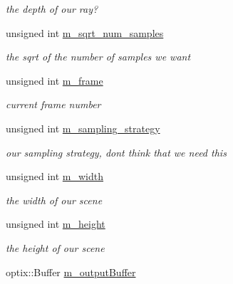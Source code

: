 \begin{DoxyCompactItemize}
\begin{DoxyCompactList}\small\item\em the depth of our ray? \end{DoxyCompactList}\item 
unsigned int \hyperlink{class_path_tracer_scene_a54c990fc584924a849a91c345781ba1f}{m\-\_\-sqrt\-\_\-num\-\_\-samples}
\begin{DoxyCompactList}\small\item\em the sqrt of the number of samples we want \end{DoxyCompactList}\item 
\hypertarget{class_path_tracer_scene_abcc2dc1fbfebf761b5efc99a2ba8396b}{unsigned int \hyperlink{class_path_tracer_scene_abcc2dc1fbfebf761b5efc99a2ba8396b}{m\-\_\-frame}}\label{class_path_tracer_scene_abcc2dc1fbfebf761b5efc99a2ba8396b}

\begin{DoxyCompactList}\small\item\em current frame number \end{DoxyCompactList}\item 
\hypertarget{class_path_tracer_scene_a5946ba11937faeed09da1a96a60bb359}{unsigned int \hyperlink{class_path_tracer_scene_a5946ba11937faeed09da1a96a60bb359}{m\-\_\-sampling\-\_\-strategy}}\label{class_path_tracer_scene_a5946ba11937faeed09da1a96a60bb359}

\begin{DoxyCompactList}\small\item\em our sampling strategy, dont think that we need this \end{DoxyCompactList}\item 
\hypertarget{class_path_tracer_scene_a6be2decdb83ccb31bfc55ba7beeca1b1}{unsigned int \hyperlink{class_path_tracer_scene_a6be2decdb83ccb31bfc55ba7beeca1b1}{m\-\_\-width}}\label{class_path_tracer_scene_a6be2decdb83ccb31bfc55ba7beeca1b1}

\begin{DoxyCompactList}\small\item\em the width of our scene \end{DoxyCompactList}\item 
\hypertarget{class_path_tracer_scene_afd4bc305e519207809faaf163524a971}{unsigned int \hyperlink{class_path_tracer_scene_afd4bc305e519207809faaf163524a971}{m\-\_\-height}}\label{class_path_tracer_scene_afd4bc305e519207809faaf163524a971}

\begin{DoxyCompactList}\small\item\em the height of our scene \end{DoxyCompactList}\item 
\hypertarget{class_path_tracer_scene_ab440af603a366434b3298e1550622623}{optix\-::\-Buffer \hyperlink{class_path_tracer_scene_ab440af603a366434b3298e1550622623}{m\-\_\-output\-Buffer}}\label{class_path_tracer_scene_ab440af603a366434b3298e1550622623}


\end{DoxyCompactItemize}
